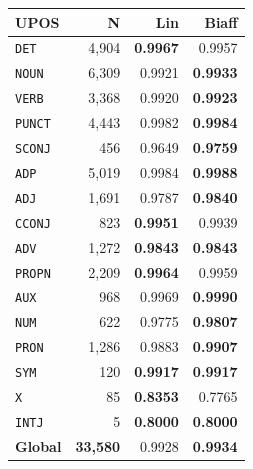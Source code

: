 \begin{table}[ht]
\begin{minipage}[t]{0.60\linewidth}
\begin{tabular}{l r  r r r r}
\bottomrule
\end{tabular}
\end{minipage}
\hfill
\begin{minipage}[t]{0.37\linewidth}
\centering
\begin{tabular}{l r  r r}
\toprule
\textbf{UPOS} & \textbf{N} & \textbf{Lin} & \textbf{Biaff} \\
\midrule
\texttt{DET} & 4,904 & \textbf{0.9967} & 0.9957 \\
\texttt{NOUN} & 6,309 & 0.9921 & \textbf{0.9933} \\
\texttt{VERB} & 3,368 & 0.9920 & \textbf{0.9923} \\
\texttt{PUNCT} & 4,443 & 0.9982 & \textbf{0.9984} \\
\texttt{SCONJ} & 456 & 0.9649 & \textbf{0.9759} \\
\texttt{ADP} & 5,019 & 0.9984 & \textbf{0.9988} \\
\texttt{ADJ} & 1,691 & 0.9787 & \textbf{0.9840} \\
\texttt{CCONJ} & 823 & \textbf{0.9951} & 0.9939 \\
\texttt{ADV} & 1,272 & \textbf{0.9843} & \textbf{0.9843} \\
\texttt{PROPN} & 2,209 & \textbf{0.9964} & 0.9959 \\
\texttt{AUX} & 968 & 0.9969 & \textbf{0.9990} \\
\texttt{NUM} & 622 & 0.9775 & \textbf{0.9807} \\
\texttt{PRON} & 1,286 & 0.9883 & \textbf{0.9907} \\
\texttt{SYM} & 120 & \textbf{0.9917} & \textbf{0.9917} \\
\texttt{X} & 85 & \textbf{0.8353} & 0.7765 \\
\texttt{INTJ} & 5 & \textbf{0.8000} & \textbf{0.8000} \\
\midrule
\textbf{Global} & \textbf{33,580} & 0.9928 & \textbf{0.9934} \\
\bottomrule
\end{tabular}
\end{minipage}
\end{table}


